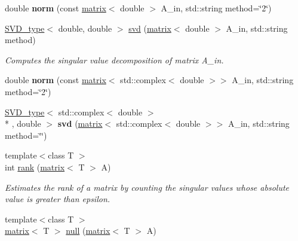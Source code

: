 \begin{DoxyCompactItemize}
\item 
\hypertarget{namespacekeycpp_a7e5236252f6a33f3523fb805a2d1727c}{double {\bfseries norm} (const \hyperlink{classkeycpp_1_1matrix}{matrix}$<$ double $>$ A\-\_\-in, std\-::string method=\char`\"{}2\char`\"{})}\label{namespacekeycpp_a7e5236252f6a33f3523fb805a2d1727c}

\item 
\hypertarget{namespacekeycpp_a4b80bd145aab03a9e79a42d32ca573bd}{\hyperlink{structkeycpp_1_1_s_v_d__type}{S\-V\-D\-\_\-type}$<$ double, double $>$ \hyperlink{namespacekeycpp_a4b80bd145aab03a9e79a42d32ca573bd}{svd} (\hyperlink{classkeycpp_1_1matrix}{matrix}$<$ double $>$ A\-\_\-in, std\-::string method)}\label{namespacekeycpp_a4b80bd145aab03a9e79a42d32ca573bd}

\begin{DoxyCompactList}\small\item\em Computes the singular value decomposition of matrix A\-\_\-in. \end{DoxyCompactList}\item 
\hypertarget{namespacekeycpp_a867ba604b4e72e41b123f890dd66d854}{double {\bfseries norm} (const \hyperlink{classkeycpp_1_1matrix}{matrix}$<$ std\-::complex$<$ double $>$$>$ A\-\_\-in, std\-::string method=\char`\"{}2\char`\"{})}\label{namespacekeycpp_a867ba604b4e72e41b123f890dd66d854}

\item 
\hypertarget{namespacekeycpp_aa6d15c3c38ff98e6d9afdd9db4b46c6c}{\hyperlink{structkeycpp_1_1_s_v_d__type}{S\-V\-D\-\_\-type}$<$ std\-::complex$<$ double $>$\\*
, double $>$ {\bfseries svd} (\hyperlink{classkeycpp_1_1matrix}{matrix}$<$ std\-::complex$<$ double $>$$>$ A\-\_\-in, std\-::string method=\char`\"{}\char`\"{})}\label{namespacekeycpp_aa6d15c3c38ff98e6d9afdd9db4b46c6c}

\item 
\hypertarget{namespacekeycpp_a4a7bb7923c2ff72fdf6a54ee1b891c16}{{\footnotesize template$<$class T $>$ }\\int \hyperlink{namespacekeycpp_a4a7bb7923c2ff72fdf6a54ee1b891c16}{rank} (\hyperlink{classkeycpp_1_1matrix}{matrix}$<$ T $>$ A)}\label{namespacekeycpp_a4a7bb7923c2ff72fdf6a54ee1b891c16}

\begin{DoxyCompactList}\small\item\em Estimates the rank of a matrix by counting the singular values whose absolute value is greater than epsilon. \end{DoxyCompactList}\item 
\hypertarget{namespacekeycpp_a54f9ed89c437774e0f7391fd7d86e005}{{\footnotesize template$<$class T $>$ }\\\hyperlink{classkeycpp_1_1matrix}{matrix}$<$ T $>$ \hyperlink{namespacekeycpp_a54f9ed89c437774e0f7391fd7d86e005}{null} (\hyperlink{classkeycpp_1_1matrix}{matrix}$<$ T $>$ A)}\label{namespacekeycpp_a54f9ed89c437774e0f7391fd7d86e005}


\end{DoxyCompactItemize}
